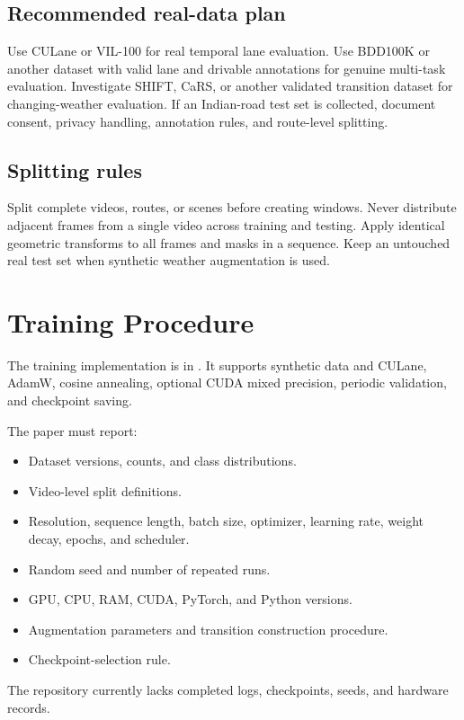 \documentclass[11pt,a4paper]{article}
\begin{document}
\subsection{Recommended real-data plan}
Use CULane or VIL-100 for real temporal lane evaluation. Use BDD100K or another dataset with valid lane and drivable annotations for genuine multi-task evaluation. Investigate SHIFT, CaRS, or another validated transition dataset for changing-weather evaluation. If an Indian-road test set is collected, document consent, privacy handling, annotation rules, and route-level splitting.

\subsection{Splitting rules}
Split complete videos, routes, or scenes before creating windows. Never distribute adjacent frames from a single video across training and testing. Apply identical geometric transforms to all frames and masks in a sequence. Keep an untouched real test set when synthetic weather augmentation is used.

\section{Training Procedure}

The training implementation is in . It supports synthetic data and CULane, AdamW, cosine annealing, optional CUDA mixed precision, periodic validation, and checkpoint saving.

The paper must report:
\begin{itemize}
\item Dataset versions, counts, and class distributions.
\item Video-level split definitions.
\item Resolution, sequence length, batch size, optimizer, learning rate, weight decay, epochs, and scheduler.
\item Random seed and number of repeated runs.
\item GPU, CPU, RAM, CUDA, PyTorch, and Python versions.
\item Augmentation parameters and transition construction procedure.
\item Checkpoint-selection rule.
\end{itemize}

The repository currently lacks completed logs, checkpoints, seeds, and hardware records.
\end{document}
